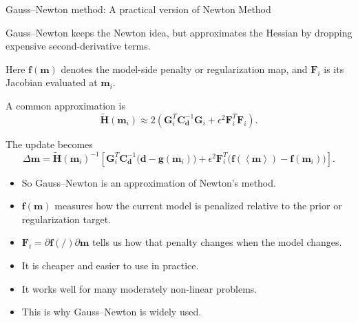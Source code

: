 \documentclass[aspectratio=169]{beamer}
\newcommand{\mat}[1]{{\mathbf{#1}}}
\renewcommand{\vec}[1]{\mathbf{#1}}
\newcommand{\dd}{ {\vec{d}} }
\newcommand{\mm}{ {\vec{m}} }
\newcommand{\delm}{ {\Delta\mm} }
\newcommand{\mmean}{\left\langle \mm \right\rangle}
\renewcommand{\gg}[1]{\vec{g}\left(#1\right)}
\newcommand{\ff}[1]{\vec{f}\left(#1\right)}
\newcommand{\GG}{\mat{G}}
\newcommand{\FF}{\mat{F}}
\newcommand{\Cd}{\mat{C}_{\dd}}
\begin{document}
\begin{frame}{Gauss--Newton method: A practical version of Newton Method}
\small

Gauss--Newton keeps the Newton idea, but approximates the Hessian by dropping expensive second-derivative terms.

\vspace{0.05cm}

Here $\ff{\mm}$ denotes the model-side penalty or regularization map, and $\FF_i$ is its Jacobian evaluated at $\mm_i$.

\vspace{0.1cm}

A common approximation is
\[
\tilde{\mat{H}}(\mm_i)
\approx
2\left(
\GG_i^T \Cd^{-1}\GG_i
+
\epsilon^2 \FF_i^T\FF_i
\right).
\]

The update becomes
\[
\delm
=
\tilde{\mat{H}}(\mm_i)^{-1}
\left[
\GG_i^T\Cd^{-1}\big(\dd-\gg{\mm_i}\big)
+
\epsilon^2\FF_i^T\big(\ff{\mmean}-\ff{\mm_i}\big)
\right].
\]

{
\vspace{0.15cm}
\begin{itemize}
    \item[--] So \alert{Gauss--Newton is an approximation of Newton's method}.
    \item[--] $\ff{\mm}$ measures how the current model is penalized relative to the prior or regularization target.
    \item[--] $\FF_i = \partial \ff / \partial \mm$ tells us how that penalty changes when the model changes.
    \item[--] It is cheaper and easier to use in practice.
    \item[--] It works well for many \alert{moderately non-linear} problems.
    \item[--] This is why \alert{Gauss--Newton is widely used}.
\end{itemize}
}
\end{frame}
\end{document}
